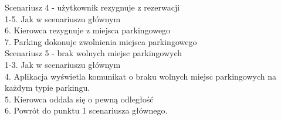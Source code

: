 \noindent Scenariusz 4 - użytkownik rezygnuje z rezerwacji \\
\hspace*{1cm} 1-5. Jak w scenariuszu głównym \\
\hspace*{1cm} 6. Kierowca rezygnuje z miejsca parkingowego \\
\hspace*{1cm} 7. Parking dokonuje zwolnienia miejsca parkingowego \\

\noindent Scenariusz 5 - brak wolnych miejsc parkingowych \\
\hspace*{1cm} 1-3. 	Jak w scenariuszu głównym \\
\hspace*{1cm} 4.	Aplikacja wyświetla komunikat o braku wolnych miejsc parkingowych na każdym typie parkingu. \\
\hspace*{1cm} 5. Kierowca oddala się o pewną odległość \\
\hspace*{1cm} 6. Powrót do punktu 1 scenariusza głównego. \\
